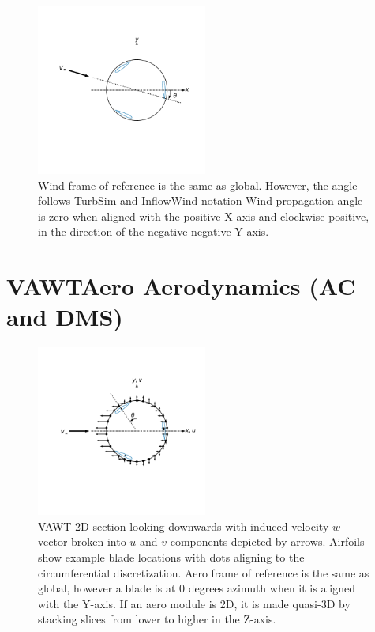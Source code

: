 \documentclass[11pt]{article}
\begin{document}
\begin{figure}[H]
\centering
\vspace{-12pt}
\includegraphics[trim={1.3cm 2.4cm .5cm 1.5cm},clip,width=0.5\textwidth]{./figs/inflow_wind}
\vspace{-5pt}
\caption{Wind frame of reference is the same as global.  However, the angle follows TurbSim and \href{https://github.com/old-NWTC/InflowWind}{InflowWind} notation Wind propagation angle is zero when aligned with the positive X-axis and clockwise positive, in the direction of the negative negative Y-axis.}
\label{fig:ac_velocities}
\end{figure}

\section{VAWTAero Aerodynamics (AC and DMS)}

\begin{figure}[H]
\centering
\vspace{-12pt}
\includegraphics[trim={1.3cm 2.4cm .5cm 1.5cm},clip,width=0.5\textwidth]{./figs/vawt_slice}
\vspace{-12pt}
\caption{VAWT 2D section looking downwards with induced velocity \(w\) vector broken into \(u\) and \(v\) components depicted by arrows. Airfoils show example blade locations with dots aligning to the circumferential discretization.  Aero frame of reference is the same as global, however a blade is at 0 degrees azimuth when it is aligned with the Y-axis.  If an aero module is 2D, it is made quasi-3D by stacking slices from lower to higher in the Z-axis.}
\label{fig:ac_velocities}
\end{figure}
\end{document}
